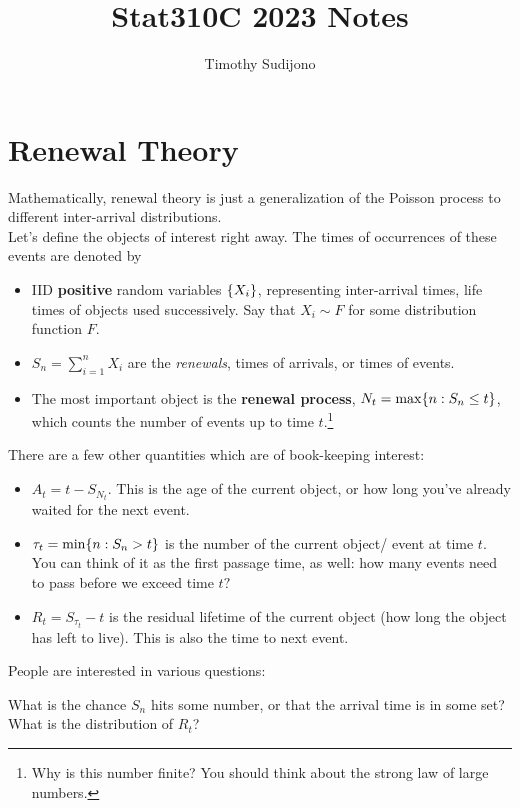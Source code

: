 \documentclass[12pt]{article}
\title{Stat310C 2023 Notes}
\author{Timothy Sudijono}
\begin{document}
\maketitle

\section{Renewal Theory}

Mathematically, renewal theory is just a generalization of the Poisson process to different inter-arrival distributions.\\

Let's define the objects of interest right away.  The times of occurrences of these events are denoted by 
\begin{itemize}
    \item IID \textbf{positive} random variables $\lbrace X_i \rbrace$, representing inter-arrival times, life times of objects used successively. Say that $X_i \sim F$ for some distribution function $F.$
    \item $S_n = \sum_{i=1}^n X_i$ are the \textit{renewals}, times of arrivals, or times of events.
    \item The most important object is the \textbf{renewal process}, $N_t = \max\lbrace n:S_n \leq t \rbrace$, which counts the number of events up to time $t.$\footnote{Why is this number finite? You should think about the strong law of large numbers.}
\end{itemize}

There are a few other quantities which are of book-keeping interest: 
\begin{itemize}
    \item $A_t = t - S_{N_t}$. This is the age of the current object, or how long you've already waited for the next event.
    \item $\tau_t = \min\lbrace n: S_n > t \rbrace$ is the number of the current object/ event at time $t$. You can think of it as the first passage time, as well: how many events need to pass before we exceed time $t?$ 
    \item $R_t = S_{\tau_t} - t$ is the residual lifetime of the current object (how long the object has left to live). This is also the time to next event.
\end{itemize}

People are interested in various questions:
\begin{questionbox}
What is the chance $S_n$ hits some number, or that the arrival time is in some set? What is the distribution of $R_t$?
\end{questionbox}
\end{document}

